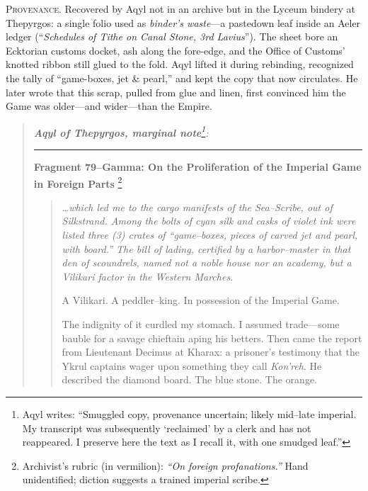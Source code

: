 \documentclass[11pt]{article}
\begin{document}
\medskip
\noindent\small\textsc{Provenance.} Recovered by Aqyl not in an archive but in the Lyceum bindery at Thepyrgos: a single folio used as \emph{binder’s waste}—a pastedown leaf inside an Aeler ledger (“\emph{Schedules of Tithe on Canal Stone, 3rd Lavius}”). The sheet bore an Ecktorian customs docket, ash along the fore-edge, and the Office of Customs’ knotted ribbon still glued to the fold. Aqyl lifted it during rebinding, recognized the tally of “game-boxes, jet \& pearl,” and kept the copy that now circulates. He later wrote that this scrap, pulled from glue and linen, first convinced him the Game was older—and wider—than the Empire. \normalsize
\medskip

\begin{quote}\small\itshape
\textbf{Aqyl of Thepyrgos, marginal note}\footnote{Aqyl writes: ``Smuggled copy, provenance uncertain; likely mid–late imperial. My transcript was subsequently `reclaimed' by a clerk and has not reappeared. I preserve here the text as I recall it, with one smudged leaf.''}:

\medskip
\upshape\noindent\rule{0.82\linewidth}{0.4pt}\par
\itshape

\textbf{Fragment 79--Gamma: On the Proliferation of the Imperial Game in Foreign Parts}%
\footnote{Archivist’s rubric (in vermilion): \emph{``On foreign profanations.''} Hand unidentified; diction suggests a trained imperial scribe.}
\label{frag:79gamma}

\begin{quote}\small\itshape
\noindent
\ldots which led me to the cargo manifests of the \emph{Sea--Scribe}, out of Silkstrand. Among the bolts of cyan silk and casks of violet ink were listed three (3) crates of ``game--boxes, pieces of carved jet and pearl, with board.'' The bill of lading, certified by a harbor--master in that den of scoundrels, named not a noble house nor an academy, but a \emph{Vilikari factor} in the Western Marches.

\smallskip
\noindent
A Vilikari. A peddler--king. In possession of the Imperial Game.

\smallskip
\noindent
The indignity of it curdled my stomach. I assumed trade---some bauble for a savage chieftain aping his betters. Then came the report from Lieutenant Decimus at Kharax: a prisoner’s testimony that the Ykrul captains wager upon something they call \emph{Kon'reh}. He described the diamond board. The blue stone. The orange.


\end{quote}
\end{quote}
\end{document}
